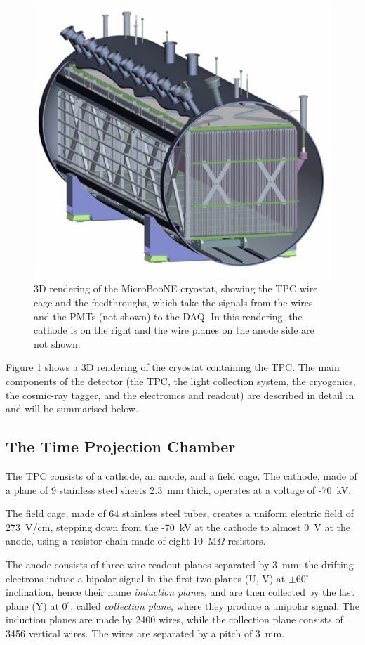 \begin{figure}[htbp]
    \centering
    \includegraphics[width=0.7\linewidth]{figures/detector.png}
    \caption{3D rendering of the MicroBooNE cryostat, showing the TPC wire cage and the feedthroughs, which take the signals from the wires and the PMTs (not shown) to the DAQ. In this rendering, the cathode is on the right and the wire planes on the anode side are not shown.}
    \label{fig:detector}
\end{figure}

Figure \ref{fig:detector} shows a 3D rendering of the cryostat containing the TPC. The main components of the detector (the TPC, the light collection system, the cryogenics, the cosmic-ray tagger, and the electronics and readout) are described in detail in \cite{Acciarri:2016smi} and will be summarised below. 

\subsection{The Time Projection Chamber}
The TPC consists of a cathode, an anode, and a field cage. 
The cathode, made of a plane of 9 stainless steel sheets 2.3~mm thick, operates at a voltage of -70~kV.

The field cage, made of 64 stainless steel tubes, creates a uniform electric field of 273~V/cm, stepping down from the -70~kV at the cathode to almost 0~V at the anode, using a resistor chain made of eight 10~M$\Omega$ resistors.

The anode consists of three wire readout planes separated by 3~mm: the drifting electrons induce a bipolar signal in the first two planes (U, V) at $\pm60^{\circ}$ inclination, hence their name \emph{induction planes}, and are then collected by the last plane (Y) at $0^{\circ}$, called \emph{collection plane}, where they produce a unipolar signal. The induction planes are made by 2400 wires, while the collection plane consists of 3456 vertical wires. The wires are separated by a pitch of 3~mm.

